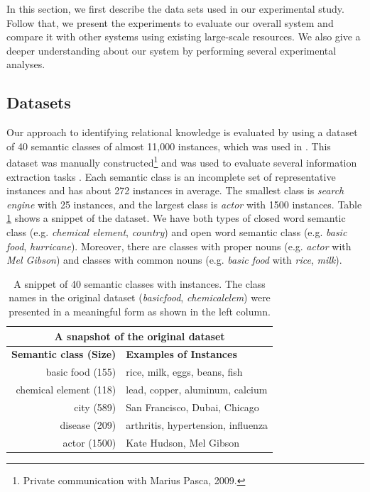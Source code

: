 In this section, we first describe the data sets used in our
experimental study. Follow that, we present the experiments to
evaluate our overall system and compare it with other systems using
existing large-scale resources. We also give a deeper understanding
about our system by performing several experimental analyses.

\subsection{Datasets}
\label{sec:dataset}

Our approach to identifying relational knowledge is evaluated by using
a dataset of 40 semantic classes of almost 11,000 instances, which was
used in \cite{citeulike:1587018}. This dataset was manually
constructed\footnote{Private communication with Marius Pasca, 2009.}
and was used to evaluate several information extraction tasks
\cite{citeulike:1587018,pacsca-vandurme:2008:ACLMain}.  Each semantic
class is an incomplete set of representative instances and has about
272 instances in average. The smallest class is {\em search engine}
with 25 instances, and the largest class is {\em actor} with 1500
instances. Table \ref{table:class-instance} shows a snippet of the
dataset. We have both types of closed word semantic
class (e.g. {\em chemical element}, {\em country}) and open word
semantic class (e.g. {\em basic food}, {\em hurricane}). Moreover,
there are classes with proper nouns (e.g. {\em actor} with {\em Mel
  Gibson}) and classes with common nouns
(e.g. {\em basic food} with {\em rice}, {\em milk}).

\begin{table}[!t]
\small
  \centering
  \begin{tabular}{|r|l|}
    \hline
    \multicolumn{2}{|c|}{A snapshot of the original dataset} \\
    \hline
    \textbf{Semantic class (Size)} & \textbf{Examples of Instances} \\
    \hline
    \hline
    basic food (155) & rice, milk, eggs, beans, fish \\
    \hline
    chemical element (118) & lead, copper, aluminum, calcium \\
    \hline
    city (589) & San Francisco, Dubai, Chicago \\
    \hline
    disease (209) & arthritis, hypertension, influenza \\
    \hline
    actor (1500) & Kate Hudson, Mel Gibson \\
    \hline
  \end{tabular}
  \caption{A snippet of 40 semantic classes with instances. 
    The class names in the original dataset ({\em basicfood}, 
    {\em chemicalelem}) were presented in a meaningful form
    as shown in the left column.}
  \label{table:class-instance}
\end{table}

